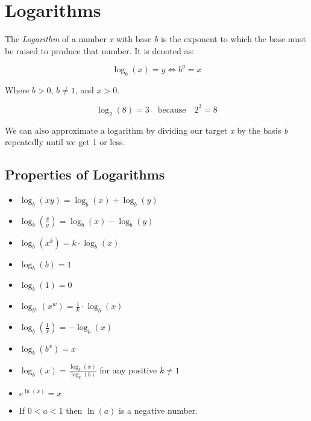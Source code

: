\newpage
\section{Logarithms}

The \emph{Logarithm} of a number \emph{x} 
with base \emph{b} is the exponent to which the base must be raised to produce that number. It is 
denoted as:

\[
    \log_b(x) = y \iff b^y = x
\]

Where \(b > 0\), \(b \neq 1\), and \(x > 0\).

\[
    \log_2(8) = 3 \quad \text{because} \quad 2^3 = 8
\]

We can also approximate a logarithm by dividing our target \emph{x} by the basis \emph{b} repeatedly until 
we get 1 or less.

\subsection{Properties of Logarithms}

\begin{itemize}

    \item \(\log_b(xy) = \log_b(x) + \log_b(y)\)

    \item \(\log_b\left(\frac{x}{y}\right) = \log_b(x) - \log_b(y)\)

    \item \(\log_b(x^k) = k \cdot \log_b(x)\)

    \item \(\log_b(b) = 1\)

    \item \(\log_b(1) = 0\)

    \item \(\log_{b^k}(x^w) = \frac{1}{k} \cdot \log_b(x)\)

    \item \(\log_b\left(\frac{1}{x}\right) = -\log_b(x)\)

    \item \(\log_b(b^x) = x\)

    \item \(\log_b(x) = \frac{\log_k(x)}{\log_k(b)}\) for any positive \(k \neq 1\)

    \item \(e^{\ln(x)} = x\)

    \item If \(0 < a < 1\) then \(\ln(a)\) is a negative number. 

\end{itemize}

